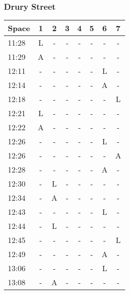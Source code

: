 \subsubsection*{Drury Street}
\begin{tabularx}{\textwidth}{|X|c|c|c|c|c|c|c|}
    \hline
    Space & 1 & 2 & 3 & 4 & 5 & 6 & 7 \\
    \hline
    11:28 & L & - & - & - & - & - & - \\ \hline
    11:29 & A & - & - & - & - & - & - \\ \hline
    12:11 & - & - & - & - & - & L & - \\ \hline
    12:14 & - & - & - & - & - & A & - \\ \hline
    12:18 & - & - & - & - & - & - & L \\ \hline
    12:21 & L & - & - & - & - & - & - \\ \hline
    12:22 & A & - & - & - & - & - & - \\ \hline
    12:26 & - & - & - & - & - & L & - \\ \hline
    12:26 & - & - & - & - & - & - & A \\ \hline
    12:28 & - & - & - & - & - & A & - \\ \hline
    12:30 & - & L & - & - & - & - & - \\ \hline
    12:34 & - & A & - & - & - & - & - \\ \hline
    12:43 & - & - & - & - & - & L & - \\ \hline
    12:44 & - & L & - & - & - & - & - \\ \hline
    12:45 & - & - & - & - & - & - & L \\ \hline
    12:49 & - & - & - & - & - & A & - \\ \hline
    13:06 & - & - & - & - & - & L & - \\ \hline
    13:08 & - & A & - & - & - & - & - \\
    \hline
\end{tabularx}